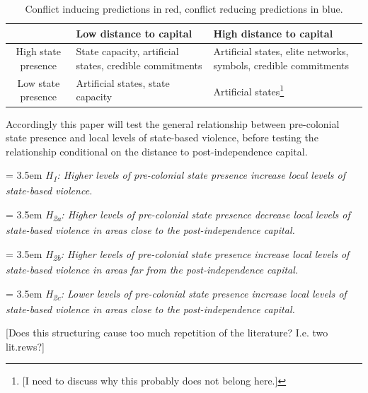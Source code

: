 \documentclass[12pt]{article}
\begin{document}
\begin{table}
\begin{tabularx}{\textwidth} { c | X | X }
	& Low distance to capital & High distance to capital \\ \hline
	High state presence & {\color{blue} State capacity, artificial states,
		credible commitments} & {\color{red} Artificial states, elite
			networks, symbols}, {\color{blue} credible
				commitments} \\ \hline
	Low state presence & \color{red} Artificial states, state capacity &
		\color{red} Artificial states\footnote{[I need to discuss why
		this probably does not belong here.]}
\end{tabularx}
\caption{Conflict inducing predictions in {\color{red}red}, conflict reducing
predictions in {\color{blue}blue}.}
\label{twoXtwo}
\end{table}
	
Accordingly this paper will test the general relationship between pre-colonial
state presence and local levels of state-based violence, before testing the
relationship conditional on the distance to post-independence capital.

\bigskip
\hangindent = 3.5em \textit{H\textsubscript{1}: Higher levels of pre-colonial
	state presence increase local levels of state-based violence.}

\bigskip
\hangindent = 3.5em \textit{H\textsubscript{2a}: Higher levels of pre-colonial
	state presence decrease local levels of state-based violence in areas
	close to the post-independence capital.}

\bigskip
\hangindent = 3.5em \textit{H\textsubscript{2b}: Higher levels of pre-colonial
	state presence increase local levels of state-based violence in areas
	far from the post-independence capital.}

\bigskip
\hangindent = 3.5em \textit{H\textsubscript{2c}: Lower levels of pre-colonial
	state presence increase local levels of state-based violence in areas
	close to the post-independence capital.}

[Does this structuring cause too much repetition of the literature? I.e. two
lit.rews?] 
\end{document}
